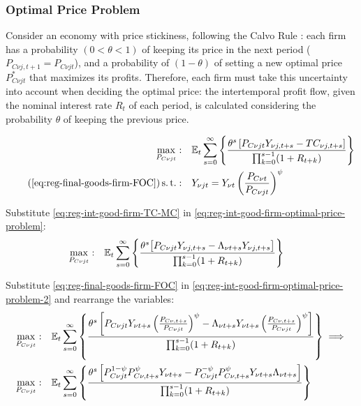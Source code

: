 \documentclass[
	thesis.tex
	]{subfiles}
\begin{document}
\subsubsection*{Optimal Price Problem}

Consider an economy with price stickiness, following the Calvo Rule \cite{calvo_staggered_1983}: each firm has a probability $(0 < \theta < 1)$ of keeping its price in the next period ($P_{C\nu j,t+1} = P_{C\nu jt}$), and a probability of $(1 - \theta)$ of setting a new optimal price $P_{C\nu jt}^\ast$ that maximizes its profits. Therefore, each firm must take this uncertainty into account when deciding the optimal price: the intertemporal profit flow, given the nominal interest rate $R_t$ of each period, is calculated considering the probability $\theta$ of keeping the previous price.

\begin{align}
	\label{eq:reg-int-good-firm-optimal-price-problem}
	\max_{P_{C\nu jt}}: & \quad \E \sum_{s=0}^{\infty} \left\{ \frac{ \theta^s \left[ P_{C\nu jt} Y_{\nu j,t+s} - TC_{\nu j,t+s} \right] }{\prod_{k=0}^{s-1}(1+R_{t+k})} \right\} \\
	\tag{\ref{eq:reg-final-goods-firm-FOC}}
	\st: & \quad Y_{\nu jt} = Y_{\nu t} \left( \frac{P_{C\nu t}}{P_{C\nu jt}} \right)^{\psi}
\end{align}


Substitute \ref{eq:reg-int-good-firm-TC-MC} in \ref{eq:reg-int-good-firm-optimal-price-problem}:
\begin{align}
	\label{eq:reg-int-good-firm-optimal-price-problem-2}
	\max_{P_{C\nu jt}}: & \quad {\mathbb{E}_{t}} \sum_{s=0}^{\infty} \left\{ \frac{\theta^s \big[ P_{C\nu jt} Y_{\nu j,t+s} - \Lambda_{\nu t+s} Y_{\nu j,t+s} \big]}{\prod_{k=0}^{s-1}(1+R_{t+k})} \right\}
\end{align}

Substitute \ref{eq:reg-final-goods-firm-FOC} in \ref{eq:reg-int-good-firm-optimal-price-problem-2} and rearrange the variables:
\begin{align}
	\max_{P_{C\nu jt}}: & \quad {\mathbb{E}_{t}} \sum_{s=0}^{\infty} \left\{ \frac{\theta^s \left[ P_{C\nu jt} Y_{\nu t+s} \left( \frac{P_{C\nu, t+s}}{P_{C\nu jt}} \right)^{\psi} - \Lambda_{\nu t+s} Y_{\nu t+s} \left( \frac{P_{C\nu, t+s}}{P_{C\nu jt}} \right)^{\psi} \right] }{\prod_{k=0}^{s-1}(1+R_{t+k})} \right\} \implies \nonumber 
	\\
	\max_{P_{C\nu jt}}: & \quad {\mathbb{E}_{t}} \sum_{s=0}^{\infty} \left\{ \frac{\theta^s \left[ P_{C\nu jt}^{1-\psi} P_{C\nu, t+s}^{\psi} Y_{\nu t+s} - P_{C\nu jt}^{-\psi} P_{C\nu, t+s}^{\psi} Y_{\nu t+s} \Lambda_{\nu t+s} \right] }{\prod_{k=0}^{s-1}(1+R_{t+k})} \right\} \nonumber
\end{align}
\end{document}
